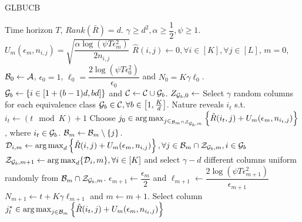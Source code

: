 \begin{algorithm}[!th]
\caption{GLBUCB}
\label{alg:NGLB}
\begin{algorithmic}[1]
 Time horizon $T$, $Rank(\bar{R}) = d$.
 $\gamma \geq d^2, \alpha \geq  \dfrac{1}{2}, \psi \geq 1$.
 $U_m(\epsilon_m, n_{i,j}) = \sqrt{\dfrac{\alpha\log(\psi T\epsilon_m^2)}{2n_{i,j}} }$
 $\hat{R}(i,j) \leftarrow 0, \forall i\in [K], \forall j\in [L]$, $m=0$, $\mathcal{B}_0 \leftarrow \mathcal{A}$, $\epsilon_0=1$, $\ell_0 =  \dfrac{2\log(\psi T\epsilon_{0}^2)}{\epsilon_{0}} $ and $N_0 =  K\gamma \ell_0 $.
 
\State  $\mathcal{G}_{b}\leftarrow \left\lbrace i\in \left[1+(b-1)d, bd\right]\right\rbrace$ and $\mathcal{C}\leftarrow \mathcal{C}\cup \mathcal{G}_{b}$.
\EndFor
\State $Z_{\mathcal{G}_b, 0}\leftarrow$ Select $\gamma$ random columns for each equivalence class $\mathcal{G}_b\in\mathcal{C}, \forall b\in \left[1,\frac{K}{d}\right] $. %
\State Nature reveals $i_t$ s.t. $i_t \leftarrow (t \mod K) + 1$ 
  
\State Choose $j_0 \in \mathop{\rm arg\,max}_{j\in_{\mathcal{B}_m\cap \mathcal{Z}_{\mathcal{G}_b,m}}}\left\lbrace \hat{R}(i_t,j)  + U_m(\epsilon_m, n_{i_t,j})\right\rbrace $, where $i_t\in \mathcal{G}_b$.
\Else {}
\ColElim
\State {}
\State {}
\State $\mathcal{B}_m \leftarrow \mathcal{B}_m \setminus \lbrace j \rbrace$. 
\EndWhile
\EndFor
\EndColElim
\ResParam
{} 
\State $\mathcal{D}_{i,m} \leftarrow \mathop{\rm arg\,max}_d\left\lbrace \hat{R}(i,j)  + U_m(\epsilon_m, n_{i,j})\right\rbrace, \forall j\in \mathcal{B}_m\cap\mathcal{Z}_{\mathcal{G}_b,m}, i\in\mathcal{G}_b$
\EndFor
{} 
\State $\mathcal{Z}_{\mathcal{G}_b,m+1}\leftarrow \mathop{\rm arg\,max}_d\lbrace \mathcal{D}_i,m\rbrace, \forall i\in [K]$ and select $\gamma - d$ different columns uniform randomly from $\mathcal{B}_m\cap\mathcal{Z}_{\mathcal{G}_b,m}$.
\EndFor
\State $\epsilon_{m+1} \leftarrow \dfrac{\epsilon_m}{2}$ and $\ell_{m+1} \leftarrow \dfrac{2\log(\psi T\epsilon_{m+1}^2)}{\epsilon_{m+1}}$
\State $N_{m+1}\leftarrow t + K \gamma \ell_{m+1} $ and $m \leftarrow m + 1$.
\EndResParam
\EndIf
\Else {}
\State  Select column $j_t^*\in \mathop{\rm arg\,max}_{j\in\mathcal{B}_m} \left\lbrace \hat{R}(i_t,j) + U_m(\epsilon_m, n_{i_t,j})\right\rbrace$ 
\EndIf
\EndFor
\end{algorithmic}
\end{algorithm}


